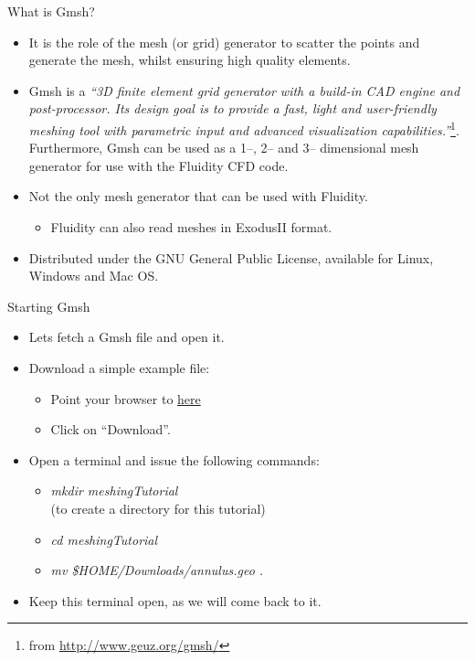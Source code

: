 \documentclass[t]{beamer}
\begin{document}
\begin{frame}{What is Gmsh?}
\begin{itemize}
\item It is the role of the mesh (or grid) generator to scatter the points and generate the mesh, whilst ensuring high quality elements.
\item Gmsh is a \emph{``3D finite element grid generator with a build-in CAD engine and post-processor. Its design goal is to provide a fast, light and user-friendly meshing tool with parametric input and advanced visualization capabilities.''}\footnote{from \url{http://www.geuz.org/gmsh/}}. Furthermore, Gmsh can be used as a 1--, 2-- and 3-- dimensional mesh generator for use with the Fluidity CFD code.
\item Not the only mesh generator that can be used with Fluidity.
\begin{itemize}
   \item Fluidity can also read meshes in ExodusII format.
\end{itemize}
\item Distributed under the GNU General Public License, available for Linux, Windows and Mac OS.
\end{itemize}
\end{frame}

\begin{frame}{Starting Gmsh}
\begin{itemize}
   \item Lets fetch a Gmsh file and open it.
   \item Download a simple example file:
   \begin{itemize}
      \item[] \hspace{-60pt}Point your browser to \href{http://figshare.com/s/b0936b565f8211e4aee906ec4b8d1f61}{here}
      \item[] \hspace{-60pt}Click on ``Download''.
   \end{itemize}
   \item Open a terminal and issue the following commands:\\[10pt]
   \begin{itemize}
      \item[] \hspace{-60pt}\emph{mkdir meshingTutorial} \\(to create a directory for this tutorial)
      \item[] \hspace{-60pt}\emph{cd meshingTutorial}
      \item[] \hspace{-60pt}\emph{mv \$HOME/Downloads/annulus.geo .}
   \end{itemize}
   \item Keep this terminal open, as we will come back to it.\\
\end{itemize}
\end{frame}
\end{document}
